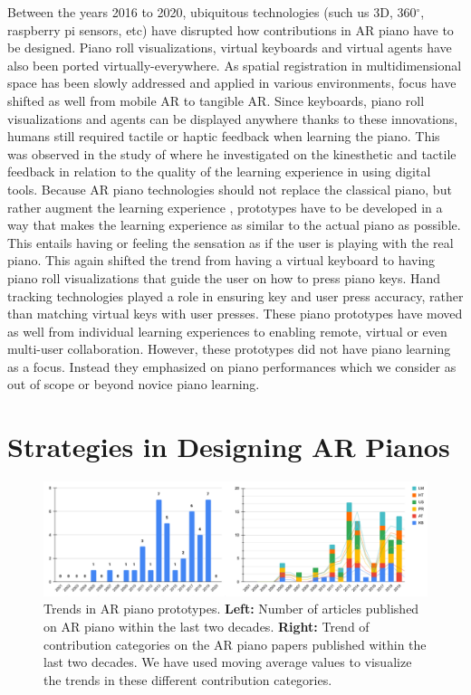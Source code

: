 \documentclass[sigchi, review]{acmart}
\begin{document}
Between the years 2016 to 2020, ubiquitous technologies (such us 3D, 360$^{\circ}$, raspberry pi sensors, etc) have disrupted how contributions in AR piano have to be designed. Piano roll visualizations, virtual keyboards and virtual agents have also been ported virtually-everywhere. As spatial registration in multidimensional space has been slowly addressed \cite{roberts2011spatial,novotny2013applications, billinghurst2008tangible} and applied in various environments, focus have shifted as well from mobile AR to tangible AR. Since keyboards, piano roll visualizations and agents can be displayed anywhere thanks to these innovations, humans still required tactile or haptic feedback when learning the piano. This was observed in the study of \citet{hamam2013effect} where he investigated on the kinesthetic and tactile feedback in relation to the quality of the learning experience in using digital tools. Because AR piano technologies should not replace the classical piano, but rather augment the learning experience \cite{yang2020modern}, prototypes have to be developed in a way that makes the learning experience as similar to the actual piano as possible. This entails having or feeling the sensation as if the user is playing with the real piano. This again shifted the trend from having a virtual keyboard to having piano roll visualizations that guide the user on how to press piano keys. Hand tracking technologies played a role in ensuring key and user press accuracy, rather than matching virtual keys with user presses. These piano prototypes have moved as well from individual learning experiences to enabling remote, virtual or even multi-user collaboration. However, these prototypes did not have piano learning as a focus. Instead they emphasized on piano performances which we consider as out of scope or beyond novice piano learning. 

\section{Strategies in Designing AR Pianos}
\label{sec: strat}

\begin{figure}[t]
    \centering
    \includegraphics[width=17cm]{figures/doublechart.png}
    \caption{Trends in AR piano prototypes. \textbf{Left:} Number of articles published on AR piano within the last two decades. \textbf{Right:} Trend of contribution categories on the AR piano papers published within the last two decades. We have used moving average values to visualize the trends in these different contribution categories. }
    \label{fig:doublechart}
\end{figure}  
\end{document}

